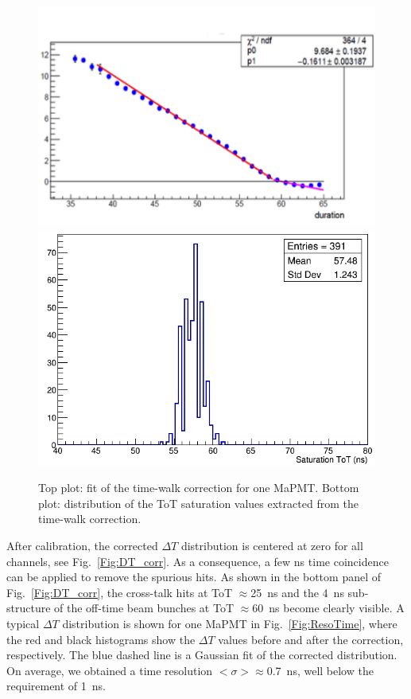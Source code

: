 \documentclass[5p,times,twocolumn]{elsarticle}
\def\dT{$\Delta T$ }
\begin{document}
\begin{figure}[t]
\begin{center}
\includegraphics[width=1.0\columnwidth]{time_walk_fit.png}
\includegraphics[width=1.0\columnwidth]{timewalk_D0.png}
\end{center}
\caption{Top plot: fit of the time-walk correction for one MaPMT. Bottom plot: distribution of the ToT saturation
  values extracted from the time-walk correction.}
\label{Fig:TimeWalk}
\end{figure}

After calibration, the corrected $\Delta T$ distribution is centered at zero for all channels, see
Fig.~\ref{Fig:DT_corr}. As a consequence, a few ns time coincidence can be applied to remove the spurious hits. As
shown in the bottom panel of Fig.~\ref{Fig:DT_corr}, the cross-talk hits at ToT $\approx$25~ns and the 4~ns
sub-structure of the off-time beam bunches at ToT $\approx$60~ns become clearly visible. A typical \dT
distribution is shown for one MaPMT in Fig.~\ref{Fig:ResoTime}, where the red and black histograms show the
$\Delta T$ values before and after the correction, respectively. The blue dashed line is a Gaussian fit of the
corrected distribution.
On average, we obtained a time resolution $<\sigma> \approx$0.7~ns, well below the requirement of 1~ns.
\end{document}
